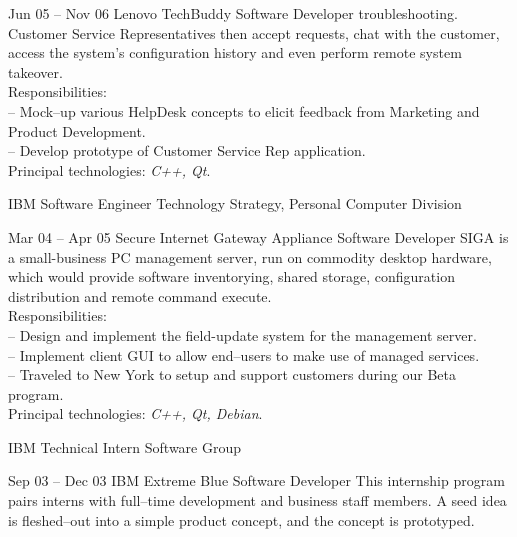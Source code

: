 \documentclass[a4paper, 10pt]{article}
\begin{document}
\begin{resume}
\begin{project} {Jun 05 -- Nov 06} {Lenovo TechBuddy} {Software Developer}
            troubleshooting.  Customer Service Representatives then accept requests,
            chat with the customer, access the system's configuration history and even
            perform remote system takeover.
            \\[1ex]
            Responsibilities: \\
            -- Mock--up various HelpDesk concepts to elicit feedback from Marketing and Product Development. \\
            -- Develop prototype of Customer Service Rep application.
            \\[1ex]
            Principal technologies: \emph{C++, Qt}.
        \end{project}
        \begin{position} {IBM} {Software Engineer} {Technology Strategy, Personal Computer Division}
        \end{position}
        \begin{project} {Mar 04 -- Apr 05} {Secure Internet Gateway Appliance} {Software Developer}
            SIGA is a small-business PC management server, run on commodity desktop
            hardware, which would provide software inventorying, shared storage,
            configuration distribution and remote command execute.
            \\[1ex]
            Responsibilities: \\
            -- Design and implement the field-update system for the management server. \\
            -- Implement client GUI to allow end--users to make use of managed services. \\
            -- Traveled to New York to setup and support customers during our Beta program.
            \\[1ex]
            Principal technologies: \emph{C++, Qt, Debian}.
        \end{project}
        \begin{position} {IBM} {Technical Intern} {Software Group}
        \end{position}
        \begin{project}{Sep 03 -- Dec 03} {IBM Extreme Blue} {Software Developer}
            This internship program pairs interns with full--time development and
            business staff members.  A seed idea is fleshed--out into a simple
            product concept, and the concept is prototyped.
            \\[1ex]

\end{project}
\end{resume}
\end{document}

